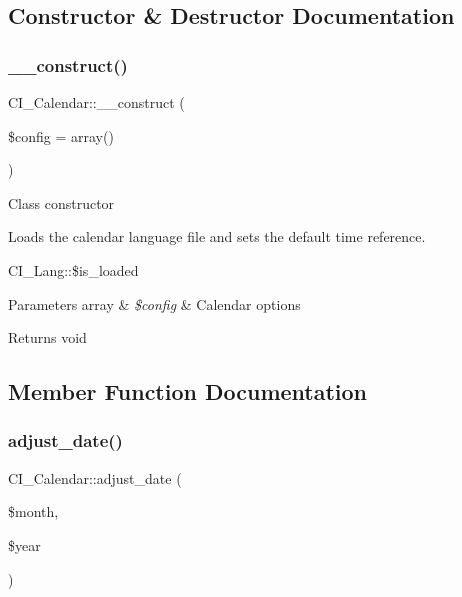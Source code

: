 \subsection{Constructor \& Destructor Documentation}
\mbox{\label{class_c_i___calendar_a897a199c844ce2d4459e7b60ce8c766a}} 
\subsubsection{\texorpdfstring{\+\_\+\+\_\+construct()}{\_\_construct()}}
{\footnotesize\ttfamily C\+I\+\_\+\+Calendar\+::\+\_\+\+\_\+construct (\begin{DoxyParamCaption}\item[{}]{\$config = {\ttfamily array()} }\end{DoxyParamCaption})}

Class constructor

Loads the calendar language file and sets the default time reference.

C\+I\+\_\+\+Lang\+::\$is\+\_\+loaded


\begin{DoxyParams}[1]{Parameters}
array & {\em \$config} & Calendar options \\
\hline
\end{DoxyParams}
\begin{DoxyReturn}{Returns}
void 
\end{DoxyReturn}


\subsection{Member Function Documentation}
\mbox{\label{class_c_i___calendar_aa059f059813fe8953253c64bad337cb0}} 
\subsubsection{\texorpdfstring{adjust\+\_\+date()}{adjust\_date()}}
{\footnotesize\ttfamily C\+I\+\_\+\+Calendar\+::adjust\+\_\+date (\begin{DoxyParamCaption}\item[{}]{\$month,  }\item[{}]{\$year }\end{DoxyParamCaption})}

